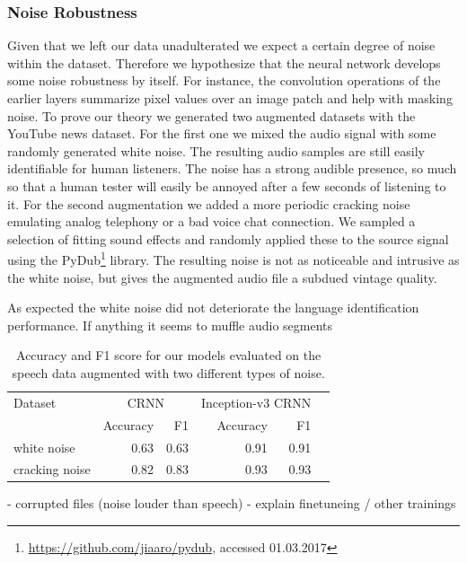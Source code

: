 \subsubsection{Noise Robustness} 
\label{sec:noise_robustness}
Given that we left our data unadulterated we expect a certain degree of noise within the dataset. Therefore we hypothesize that the neural network develops some noise robustness by itself. For instance, the convolution operations of the earlier layers summarize pixel values over an image patch and help with masking noise. To prove our theory we generated two augmented datasets with the YouTube news dataset. 
For the first one we mixed the audio signal with some randomly generated white noise. The resulting audio samples are still easily identifiable for human listeners. The noise has a strong audible presence, so much so that a human tester will easily be annoyed after a few seconds of listening to it.
For the second augmentation we added a more periodic cracking noise emulating analog telephony or a bad voice chat connection. We sampled a selection of fitting sound effects and randomly applied these to the source signal using the PyDub\footnote{\url{https://github.com/jiaaro/pydub}, accessed 01.03.2017} library. The resulting noise is not as noticeable and intrusive as the white noise, but gives the augmented audio file a subdued vintage quality.

As expected the white noise did not deteriorate the language identification performance. If anything it seems to muffle audio segments 
 
	\begin{table}[]
	\centering
	\begin{tabularx}{\textwidth}{lrrrrr}
	\toprule
	Dataset & \multicolumn{2}{c}{CRNN} & \multicolumn{2}{c}{Inception-v3 CRNN} \\  
                & Accuracy  & F1    & Accuracy  & F1   \\ \midrule
white noise     & 0.63      & 0.63  & 0.91      & 0.91 \\
cracking noise  & 0.82      & 0.83  & 0.93      & 0.93 \\
 	\bottomrule
	\end{tabularx}
	\caption{Accuracy and F1 score for our models evaluated on the speech data augmented with two different types of noise.}
	\label{tab:audio_duration}
	\end{table}


- corrupted files (noise louder than speech)
- explain finetuneing / other trainings

